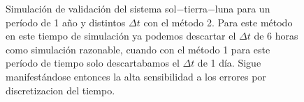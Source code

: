 \begin{figure}
{	\label{fig:ej1_m2_365_12}
	}
	\caption{
		Simulación de validación del sistema sol$-$tierra$-$luna para un período de 1 año y distintos $\Delta t$
		con el método 2.
		Para este método en este tiempo de simulación ya podemos descartar el $\Delta t$ de 6 horas como simulación razonable,
		cuando con el método 1 para este período de tiempo solo descartabamos el $\Delta t$ de 1 día.
		Sigue manifestándose entonces la alta sensibilidad a los errores por discretizacion del tiempo.
	}
	\label{ fig:res_ej1_m2_365 }
\end{figure}
